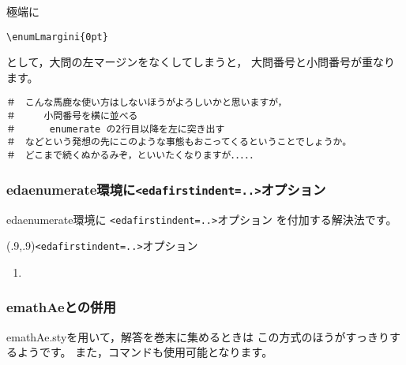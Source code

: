 \documentclass[fleqn,a4j]{jarticle}
\begin{document}
極端に
\begin{jquote}
\begin{verbatim}
\enumLmargini{0pt}
\end{verbatim}
\end{jquote}
として，大問の左マージンをなくしてしまうと，
大問番号と小問番号が重なります。

\begin{verbatim}
＃　こんな馬鹿な使い方はしないほうがよろしいかと思いますが，
＃　　　小問番号を横に並べる
＃      enumerate の2行目以降を左に突き出す
＃　などという発想の先にこのような事態もおこってくるということでしょうか。
＃　どこまで続くぬかるみぞ，といいたくなりますが．．．．．
\end{verbatim}

\subsubsection{\textsf{edaenumerate}環境に\texttt{<edafirstindent=..>}オプション}
\textsf{edaenumerate}環境に \texttt{<edafirstindent=..>}オプション
を付加する解決法です。

\begin{showEx}(.9,.9){\texttt{<edafirstindent=..>}オプション}
\enumLmargini{0pt}
\begin{enumerate}[\protect\expandafter\fbox 1]
  \item
\end{enumerate}
\end{showEx}

\subsubsection{\textsf{emathAe}との併用}
\textsf{emathAe.sty}を用いて，解答を巻末に集めるときは
この方式のほうがすっきりするようです。
また，コマンドも使用可能となります。
\end{document}
